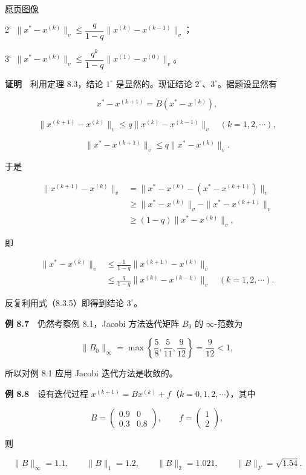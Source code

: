 \documentclass[
  10pt,
  fontset=fandol]{ctexart}
\begin{document}
\href{../../source-images/pdf-223.jpeg}{原页图像}

\(2^\circ\) \(\|x^*-x^{(k)}\|_v\leqslant\dfrac{q}{1-q}\|x^{(k)}-x^{(k-1)}\|_v\)；

\(3^\circ\) \(\|x^*-x^{(k)}\|_v\leqslant\dfrac{q^k}{1-q}\|x^{(1)}-x^{(0)}\|_v\)。

\textbf{证明}　利用定理 8.3，结论 \(1^\circ\) 是显然的。现证结论 \(2^\circ\)、\(3^\circ\)。据题设显然有

\[
x^*-x^{(k+1)}=B(x^*-x^{(k)}),
\tag{8.3.4}
\]

\[
\|x^{(k+1)}-x^{(k)}\|_v\leqslant q\|x^{(k)}-x^{(k-1)}\|_v\quad(k=1,2,\cdots),
\tag{8.3.5}
\]

\[
\|x^*-x^{(k+1)}\|_v\leqslant q\|x^*-x^{(k)}\|_v.
\tag{8.3.6}
\]

于是

\[
\begin{aligned}
\|x^{(k+1)}-x^{(k)}\|_v
&=\|x^*-x^{(k)}-(x^*-x^{(k+1)})\|_v\\
&\geqslant\|x^*-x^{(k)}\|_v-\|x^*-x^{(k+1)}\|_v\\
&\geqslant(1-q)\|x^*-x^{(k)}\|_v,
\end{aligned}
\]

即

\[
\begin{aligned}
\|x^*-x^{(k)}\|_v
&\leqslant\frac1{1-q}\|x^{(k+1)}-x^{(k)}\|_v\\
&\leqslant\frac{q}{1-q}\|x^{(k)}-x^{(k-1)}\|_v\quad(k=1,2,\cdots).
\end{aligned}
\]

反复利用式（8.3.5）即得到结论 \(3^\circ\)。

\textbf{例 8.7}　仍然考察例 8.1，Jacobi 方法迭代矩阵 \(B_0\) 的 \(\infty\)-范数为

\[
\|B_0\|_\infty=\max\left\{\frac58,\frac5{11},\frac9{12}\right\}=\frac9{12}<1,
\]

所以对例 8.1 应用 Jacobi 迭代方法是收敛的。

\textbf{例 8.8}　设有迭代过程 \(x^{(k+1)}=Bx^{(k)}+f\)（\(k=0,1,2,\cdots\)），其中

\[
B=\begin{pmatrix}0.9&0\\0.3&0.8\end{pmatrix},\qquad f=\begin{pmatrix}1\\2\end{pmatrix},
\]

则

\[
\|B\|_\infty=1.1,\qquad\|B\|_1=1.2,\qquad\|B\|_2=1.021,\qquad\|B\|_F=\sqrt{1.54}.
\]
\end{document}
